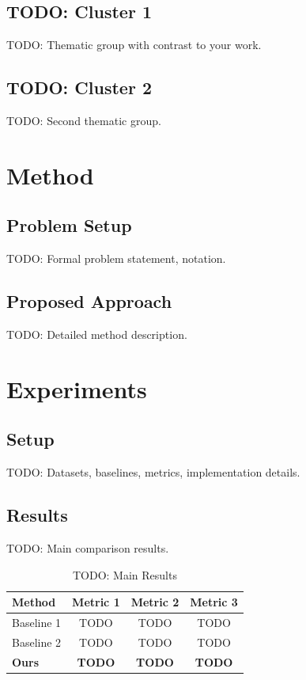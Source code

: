 \documentclass[sigconf,review,anonymous]{acmart}
\begin{document}
\subsection{TODO: Cluster 1}
TODO: Thematic group with contrast to your work.

\subsection{TODO: Cluster 2}
TODO: Second thematic group.

\section{Method}
\label{sec:method}

\subsection{Problem Setup}
TODO: Formal problem statement, notation.

\subsection{Proposed Approach}
TODO: Detailed method description.

\section{Experiments}
\label{sec:experiments}

\subsection{Setup}
TODO: Datasets, baselines, metrics, implementation details.

\subsection{Results}
TODO: Main comparison results.

\begin{table}[htbp]
\caption{TODO: Main Results}
\label{tab:main_results}
\begin{tabular}{lccc}
\toprule
Method & Metric 1 & Metric 2 & Metric 3 \\
\midrule
Baseline 1 & TODO & TODO & TODO \\
Baseline 2 & TODO & TODO & TODO \\
\textbf{Ours} & \textbf{TODO} & \textbf{TODO} & \textbf{TODO} \\
\bottomrule
\end{tabular}
\end{table}
\end{document}
